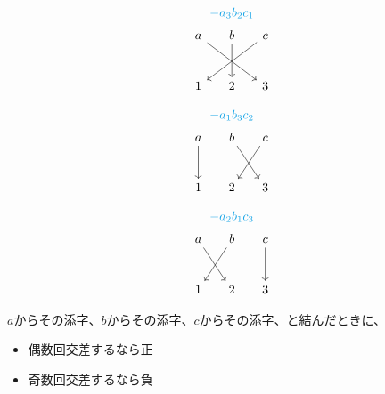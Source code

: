 \documentclass[../../../topic_linear-algebra]{subfiles}
\begin{document}
\begin{tcbraster}[raster columns=3]
\begin{tcolorbox}[empty]
\begin{equation*}
\begin{gathered}
        \textcolor{Cerulean}{-a_3b_2c_1} \\
        \begin{tikzcd}[column sep=3ex, row sep=large]
          a\arrow[rrd] & b\arrow[d] & c\arrow[lld] \\
          1 & 2 & 3
        \end{tikzcd}
      \end{gathered}
    \end{equation*}
  \end{tcolorbox}
  \begin{tcolorbox}[empty]
    \begin{equation*}
      \begin{gathered}
        \textcolor{Cerulean}{-a_1b_3c_2} \\
        \begin{tikzcd}[column sep=3ex, row sep=large]
          a\arrow[d] & b\arrow[rd] & c\arrow[ld] \\
          1 & 2 & 3
        \end{tikzcd}
      \end{gathered}
    \end{equation*}
  \end{tcolorbox}
  \begin{tcolorbox}[empty]
    \begin{equation*}
      \begin{gathered}
        \textcolor{Cerulean}{-a_2b_1c_3} \\
        \begin{tikzcd}[column sep=3ex, row sep=large]
          a\arrow[rd] & b\arrow[ld] & c\arrow[d] \\
          1 & 2 & 3
        \end{tikzcd}
      \end{gathered}
    \end{equation*}
  \end{tcolorbox}
\end{tcbraster}

\begin{emphabox}
  \begin{spacebox}
    $a$からその添字、$b$からその添字、$c$からその添字、と結んだときに、
    \begin{itemize}
      \item 偶数回交差するなら正
      \item 奇数回交差するなら負
    \end{itemize}
  \end{spacebox}
\end{emphabox}
\end{document}
